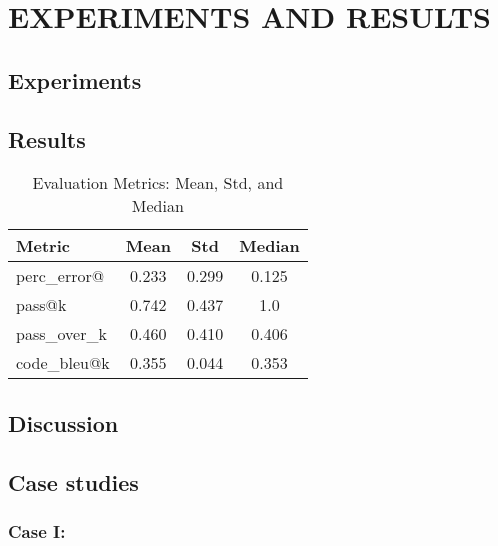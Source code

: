 \chapter{ EXPERIMENTS AND RESULTS}


\section{Experiments}

\section{Results}

\begin{table}[h!]
\centering
\caption{Evaluation Metrics: Mean, Std, and Median}
{%
\begin{tabular}{l|ccc}
\toprule
\textbf{Metric} & \textbf{Mean} & \textbf{Std} & \textbf{Median} \\
\midrule
perc\_error@ & 0.233 & 0.299 & 0.125 \\
pass@k    & 0.742 & 0.437 & 1.0   \\
pass\_over\_k  & 0.460 & 0.410 & 0.406 \\
code\_bleu@k  & 0.355 & 0.044 & 0.353 \\
\bottomrule
\end{tabular}
}
\label{tab:metrics_generated}
\end{table}

\section{Discussion}

\section{Case studies}

\subsection{Case I:}

